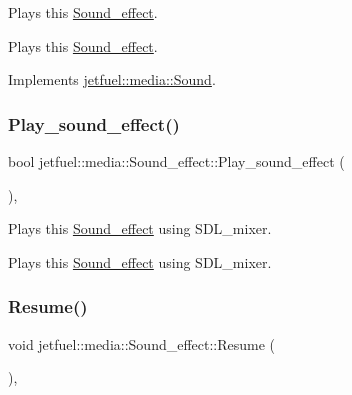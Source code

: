 Plays this \hyperlink{classjetfuel_1_1media_1_1Sound__effect}{Sound\+\_\+effect}. 

Plays this \hyperlink{classjetfuel_1_1media_1_1Sound__effect}{Sound\+\_\+effect}. 

Implements \hyperlink{classjetfuel_1_1media_1_1Sound_a8861a6671ce039522179d61085f240c8}{jetfuel\+::media\+::\+Sound}.

\mbox{\label{classjetfuel_1_1media_1_1Sound__effect_abb1c6c0b2eba2d167b654af7cbcd6d24}} 
\subsubsection{\texorpdfstring{Play\+\_\+sound\+\_\+effect()}{Play\_sound\_effect()}}
{\footnotesize\ttfamily bool jetfuel\+::media\+::\+Sound\+\_\+effect\+::\+Play\+\_\+sound\+\_\+effect (\begin{DoxyParamCaption}{ }\end{DoxyParamCaption})\hspace{0.3cm}{\ttfamily [inline]}, {\ttfamily [protected]}}



Plays this \hyperlink{classjetfuel_1_1media_1_1Sound__effect}{Sound\+\_\+effect} using S\+D\+L\+\_\+mixer. 

Plays this \hyperlink{classjetfuel_1_1media_1_1Sound__effect}{Sound\+\_\+effect} using S\+D\+L\+\_\+mixer. \mbox{\label{classjetfuel_1_1media_1_1Sound__effect_a8849f5324b2c049c63ed3a0bbbd88467}} 
\subsubsection{\texorpdfstring{Resume()}{Resume()}}
{\footnotesize\ttfamily void jetfuel\+::media\+::\+Sound\+\_\+effect\+::\+Resume (\begin{DoxyParamCaption}{ }\end{DoxyParamCaption})\hspace{0.3cm}{\ttfamily [override]}, {\ttfamily [virtual]}}



